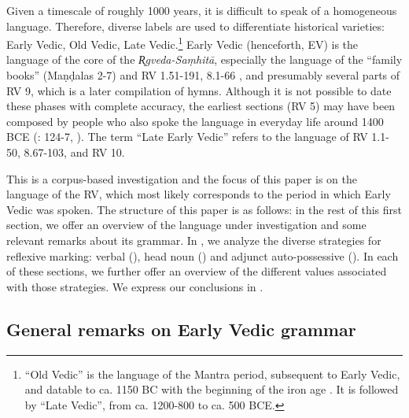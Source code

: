 \documentclass[output=paper]{langscibook}
\begin{document}
{Given a timescale of roughly 1000 years, it is difficult to speak of a homogeneous language. Therefore, diverse labels are used to differentiate historical varieties: Early Vedic, Old Vedic, Late Vedic.}\footnote{{{“Old Vedic” is the language of the Mantra period, subsequent to Early Vedic, and datable to ca. 1150 BC with the beginning of the iron age \citep[280]{Witzel1997}. It is followed by “Late Vedic”, from ca. 1200-800 to ca. 500 BCE.}}}{ Early Vedic (henceforth, EV) is the language of the core of the \textit{R̥gveda-Saṃhitā}, especially the language of the “family books” (Maṇḍalas 2-7) and RV 1.51-191, 8.1-66 \citep{Oldenberg1912}, and presumably several parts of RV 9, which is a later compilation of hymns. Although it is not possible to date these phases with complete accuracy, the earliest sections (RV 5) may have been composed by people who also spoke the language in everyday life around 1400 BCE (\citealt{Witzel1989}: 124-7, \citealt{Witzel1997}). The term “Late Early Vedic” refers to the language of RV 1.1-50, 8.67-103, and RV 10.}

{This is a corpus-based investigation and the focus of this paper is on the language of the RV, which most likely corresponds to the period in which Early Vedic was spoken. The structure of this paper is as follows: in the rest of this first section, we offer an overview of the language under investigation and some relevant remarks about its grammar. In , we analyze the diverse strategies for reflexive marking: verbal (), head noun () and adjunct auto-possessive (). In each of these sections, we further offer an overview of the different values associated with those strategies. We express our conclusions in .}



\subsection{General remarks on Early Vedic grammar}
\label{sec:Orqueda:1.2}
\end{document}
